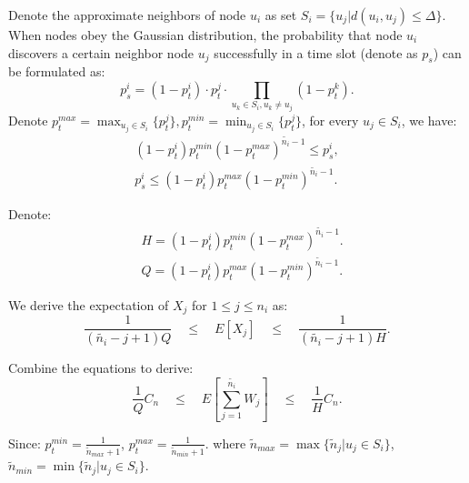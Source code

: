 \begin{IEEEproof}
Denote the approximate neighbors of node $u_i$ as set $S_i = \{u_j |
d(u_i, u_j) \leq \Delta \}$. When nodes obey the Gaussian distribution, the
probability that node $u_i$ discovers a certain neighbor node $u_{j}$
successfully in a time slot (denote as $p_{s}$) can be formulated as:
$$
p_{s}^i = (1-p_t^i) \cdot p_t^{j} \cdot \prod_{u_k \in S_i, u_k \neq u_j}(1-p_t^{k}).
$$
Denote $p_t^{max} = \max_{u_j \in S_i}\{p_t^{j}\}, p_t^{min} = \min_{u_j \in S_i}\{p_t^{j}\}$,
for every $u_j \in S_i$, we have:
\begin{equation*}
\begin{split}
(1-p_t^i)p_t^{min}{(1-p_t^{max})}^{\widetilde{n_i}-1} \leq p_{s}^i,  \\ %
p_{s}^i \leq (1-p_t^i)p_t^{max}{(1-p_t^{min})}^{\widetilde{n_i}-1}.
\end{split}
\end{equation*}

Denote: 
\begin{align*}
&H = (1-p_t^i)p_t^{min}{(1-p_t^{max})}^{\widetilde{n_i}-1}. \\
&Q = (1-p_t^i)p_t^{max}{(1-p_t^{min})}^{\widetilde{n_i}-1}.
\end{align*}

We derive the expectation of $X_j$ for $1 \leq j \leq n_i$ as:
$$
\frac{1}{(\widetilde{n_i}-j+1)Q} \quad \leq \quad E[X_j] \quad \leq \quad \frac{1}{(\widetilde{n_i}-j+1)H}.
$$

Combine the equations to derive:
$$
\frac{1}{Q}C_n  \quad \leq \quad E[\sum_{j=1}^{\widetilde{n_i}}W_j]  \quad \leq \quad \frac{1}{H}C_n.
$$

Since: $p_t^{min} = \frac{1}{\widetilde{n}_{max}+1}$, $p_t^{max} = \frac{1}{\widetilde{n}_{min}+1}.$
where $\widetilde{n}_{max} = \max\{\widetilde{n}_j | u_j\in S_i \}$, $\widetilde{n}_{min} = \min\{\widetilde{n}_j | u_j\in S_i \}$. 


\end{IEEEproof}
